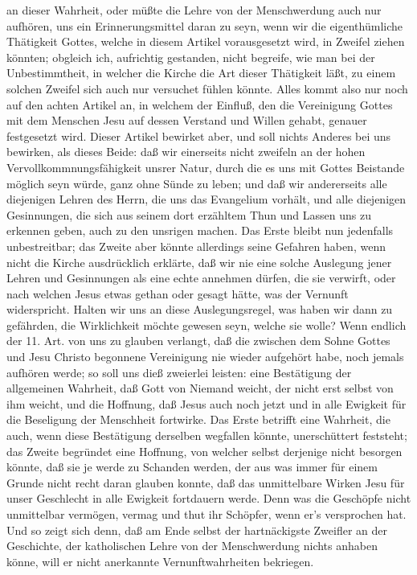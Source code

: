 an dieser Wahrheit, oder müßte die Lehre von der Menschwerdung auch nur aufhören, uns ein Erinnerungsmittel daran zu seyn, wenn wir die eigenthümliche Thätigkeit Gottes, welche in diesem Artikel vorausgesetzt wird, in Zweifel ziehen könnten; obgleich ich, aufrichtig gestanden, nicht begreife, wie man bei der Unbestimmtheit, in welcher die Kirche die Art dieser Thätigkeit läßt, zu einem solchen Zweifel sich auch nur versuchet fühlen könnte. Alles kommt also nur noch auf den achten Artikel an, in welchem der Einfluß, den die Vereinigung Gottes mit dem Menschen Jesu auf dessen Verstand und Willen gehabt, genauer festgesetzt wird. Dieser Artikel bewirket aber, und soll nichts Anderes bei uns bewirken, als dieses Beide: daß wir einerseits nicht zweifeln an der hohen Vervollkommnungsfähigkeit unsrer Natur, durch die es uns mit Gottes Beistande möglich seyn würde, ganz ohne Sünde zu leben; und daß wir andererseits alle diejenigen Lehren des Herrn, die uns das Evangelium vorhält, und alle diejenigen Gesinnungen, die sich aus seinem dort erzähltem Thun und Lassen uns zu erkennen geben, auch zu den unsrigen machen. Das Erste bleibt nun jedenfalls unbestreitbar; das Zweite aber könnte allerdings seine Gefahren haben, wenn nicht die Kirche ausdrücklich erklärte, daß wir nie eine solche Auslegung jener Lehren und Gesinnungen als eine echte annehmen dürfen, die sie verwirft, oder nach welchen Jesus etwas gethan oder gesagt hätte, was der Vernunft widerspricht. Halten wir uns an diese Auslegungsregel, was haben wir dann zu gefährden, die Wirklichkeit möchte gewesen seyn, welche sie wolle? Wenn endlich der 11. Art. von uns zu glauben verlangt, daß die zwischen dem Sohne Gottes und Jesu Christo begonnene Vereinigung nie wieder aufgehört habe, noch jemals aufhören werde; so soll uns dieß zweierlei leisten: eine Bestätigung der allgemeinen Wahrheit, daß Gott von Niemand weicht, der nicht erst selbst von ihm weicht, und die Hoffnung, daß Jesus auch noch jetzt und in alle Ewigkeit für die Beseligung der Menschheit fortwirke. Das Erste betrifft eine Wahrheit, die auch, wenn diese Bestätigung derselben wegfallen könnte, unerschüttert feststeht; das Zweite begründet eine Hoffnung, von welcher selbst derjenige nicht besorgen könnte, daß sie je werde zu Schanden werden, der aus was immer für einem Grunde nicht recht daran glauben konnte, daß das unmittelbare Wirken Jesu für unser Geschlecht in alle Ewigkeit fortdauern werde. Denn was die Geschöpfe nicht unmittelbar vermögen, vermag und thut ihr Schöpfer, wenn er's versprochen hat. Und so zeigt sich denn, daß am Ende selbst der hartnäckigste Zweifler an der Geschichte, der katholischen Lehre von der Menschwerdung nichts anhaben könne, will er nicht anerkannte Vernunftwahrheiten bekriegen. \par
